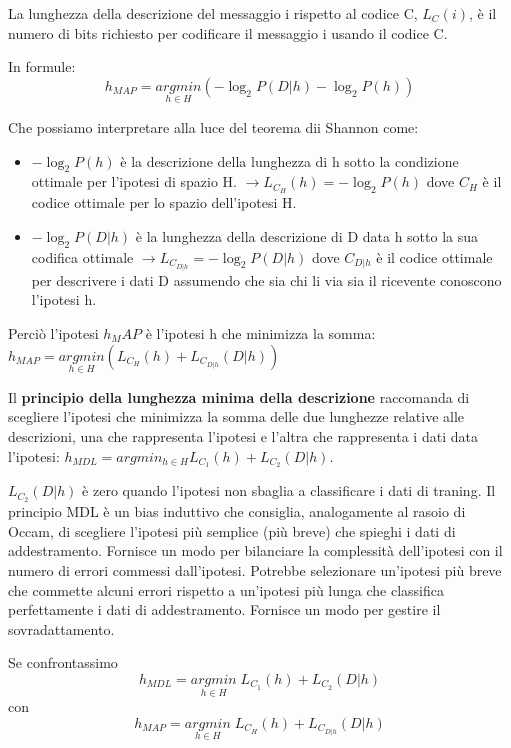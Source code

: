 \documentclass[a4paper]{extarticle}
\begin{document}
La lunghezza della descrizione del messaggio i rispetto al codice C, $L_C (i)$, è il numero di bits richiesto per codificare il messaggio i usando il codice C.

In formule:
\begin{equation*}
h_{MAP} = \underset{h \in H}{argmin} (- \log_2 P(D|h) - \log_2 P(h))
\end{equation*} 

Che possiamo interpretare alla luce del teorema dii Shannon come:
\begin{itemize}
\item $-\log_2 P(h)$ è la descrizione della lunghezza di h sotto la condizione ottimale per l'ipotesi di spazio H. $\rightarrow L_{C_H}(h) = - \log_2P(h)$ dove $C_H$ è il codice ottimale per lo spazio dell'ipotesi H.
\item  $-\log_2 P(D|h)$ è la lunghezza della descrizione di D data h sotto la sua codifica ottimale $\rightarrow L_{C_{D|h}} = - \log_2 P(D|h)$ dove $C_{D|h}$ è il codice ottimale per descrivere i dati D assumendo che sia chi li via sia il ricevente conoscono l'ipotesi h.
\end{itemize}

Perciò l'ipotesi $h_MAP$ è l'ipotesi h che minimizza la somma: $h_{MAP} = \underset{h \in H}{argmin} (L_{C_H}(h) + L_{C_{D|h}}(D|h))$

Il \textbf{principio della lunghezza minima della descrizione } raccomanda di scegliere l'ipotesi che minimizza la somma delle due lunghezze relative alle descrizioni, una che rappresenta l'ipotesi e l'altra che rappresenta i dati data l'ipotesi: $h_{MDL} = argmin_{h \in H} L_{C_1}(h) + L_{C_2} (D|h)$. 

$L_{C_2}(D|h)$ è zero quando l'ipotesi non sbaglia a classificare i dati di traning. Il principio MDL è un bias induttivo che consiglia, analogamente al rasoio di Occam, di scegliere l’ipotesi più semplice (più breve) che spieghi i dati di addestramento. Fornisce un modo per bilanciare la complessità dell'ipotesi con il numero di errori commessi dall'ipotesi. Potrebbe selezionare un'ipotesi più breve che commette alcuni errori rispetto a un'ipotesi più lunga che classifica perfettamente i dati di addestramento. Fornisce un modo per gestire il sovradattamento.

Se confrontassimo 
\begin{equation*}
h_{MDL} = \underset{h \in H}{argmin} \; L_{C_1} (h) + L_{C_2}(D|h)
\end{equation*}
con
\begin{equation*}
h_{MAP} = \underset{h \in H}{argmin} \; L_{C_H} (h) + L_{C_{D|h}}(D|h)
\end{equation*}
\end{document}

